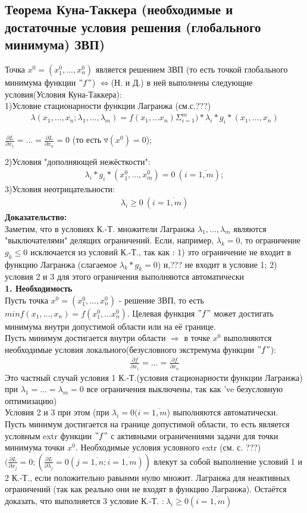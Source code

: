 \documentclass[a4paper]{article}
\newcommand{\cent}[1]{\begin{center}{#1}\end{center}} %
\newcommand{\eqn}[1]{\begin{equation*}\begin{aligned}{#1}\end{aligned}\end{equation*}} %
\begin{document}
\subsection*{Теорема Куна-Таккера (необходимые и достаточные условия решения (глобального минимума) ЗВП)} 
Точка $x^0=(x_1^0,...,x_n^0)$ является решением ЗВП (то есть точкой глобального минимума функции $"f"$) $\Leftrightarrow$(Н. и Д.) в ней выполнены следующие условия(Условия Куна-Таккера):\\
1)Условие стационарности функции Лагранжа (см.с.???)
\eqn{\lambda (x_1,...,x_n; \lambda_1,..., \lambda_m)=f(x_1,...x_n)\Sigma_{i=1}^m)*\lambda_i*g_i*(x_1,...,x_n)}
\cent{$\frac{\partial L}{\partial x_1} =...= \frac{\partial L}{\partial x_n} = 0$ (то есть  $\triangledown(x^0)=0$);}
2)Условия "дополняющей нежёсткости":
\eqn{\lambda_i * g_i*(x_1^0,..., x_m^0)=0 \ (i= \overline{1,m});}
3)Условия неотрицательности:
\eqn{\lambda_i \geq 0 \ (i=\overline{1,m})}
\textbf{Доказательство:}\\
Заметим, что в условиях К.-Т. множители Лагранжа $\lambda_1,..., \lambda_m$ являются "выключателями" делящих ограничений. Если, например, $\lambda_k=0$, то ограничение $g_k \leq 0$ исключается из условий К.-Т., так как : 1) это ограничение не входит в функцию Лагранжа (слагаемое $\lambda_k*g_k = 0$) и,??? не входит в условие 1; 2) условия 2 и 3 для этого ограничения выполняются автоматически\\
\textbf{1. Необходимость}\\
Пусть точка $x^0=(x_1^0,...,x_n^0)$ - решение ЗВП, то есть $minf(x_1,...,x_n)=f(x_1^0,...x_n^0)$. Целевая функция $"f"$ может достигать минимума внутри допустимой области или на её границе.\\
Пусть минимум достигается внутри области $\Rightarrow$ в точке $x^0$ выполняются необходимые условия локального(безусловного экстремума функции $"f"$):
\eqn{\frac{\partial f}{\partial x_1}=...=\frac{\partial f}{\partial x_n}}
Это частный случай условия 1 К.-Т.(условия стационарности функции Лагранжа) при $\lambda_1=...=\lambda_m = 0$ все ограничения выключены, так как 've безусловную оптимизацию)\\
Условия 2 и 3 при этом (при $\lambda_i = 0 (i=\overline{1,m}$) выполняются автоматически.\\
Пусть минимум достигается на границе допустимой области, то есть является условным extr функции $"f"$ с активными ограничениями задачи для точки минимума точки $x^0$. Необходимые условия условного extr (см. с. ???) $(\frac{\partial L}{\partial x_j}=0;(\frac{\partial L}{\partial \lambda_j}=0 (j=\overline{1,n}; i=\overline{1,m}))$ влекут за собой выполнение условий 1 и 2 К.-Т., если положительно равынми нулю множит. Лагранжа для неактивных ограничений (так как реально они не входят в функцию Лагранжа). Остаётся доказать, что выполняется 3 условие К.-Т. :$\ \lambda_i \geq 0 (i=\overline{1,m})$ \\
\end{document}

